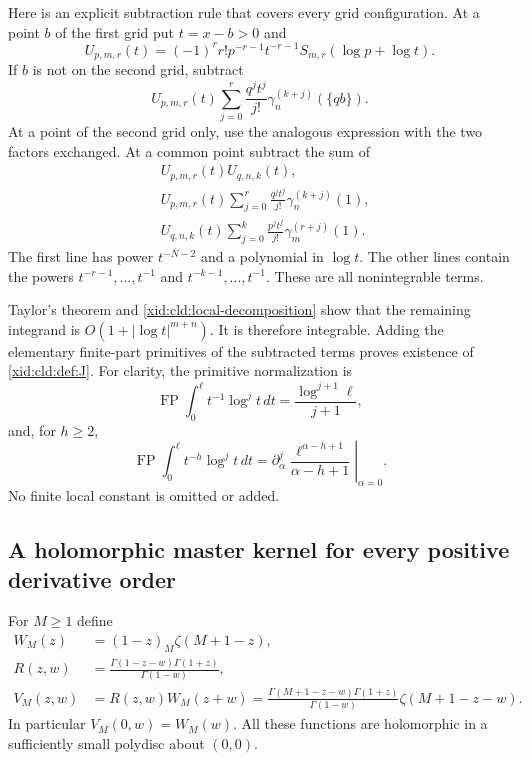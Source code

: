 \documentclass[11pt,a4paper]{article}
\numberwithin{equation}{section}
\theoremstyle{definition}
\theoremstyle{remark}
\begin{document}
Here is an explicit subtraction rule that covers every grid configuration.
At a point $b$ of the first grid put $t=x-b>0$ and
\[
 U_{p,m,r}(t)=(-1)^r r!p^{-r-1}t^{-r-1}
                     S_{m,r}(\log p+\log t).
\]
If $b$ is not on the second grid, subtract
\[
 U_{p,m,r}(t)\sum_{j=0}^r
       \frac{q^jt^j}{j!}\gamma_n^{(k+j)}(\{qb\}).
\]
At a point of the second grid only, use the analogous expression with
the two factors exchanged.  At a common point subtract the sum of
\begin{align}
 &U_{p,m,r}(t)U_{q,n,k}(t),\\
 &U_{p,m,r}(t)\sum_{j=0}^r
       \frac{q^jt^j}{j!}\gamma_n^{(k+j)}(1),\\
 &U_{q,n,k}(t)\sum_{j=0}^k
       \frac{p^jt^j}{j!}\gamma_m^{(r+j)}(1).
 \label{xid:cld:common-subtraction}
\end{align}
The first line has power $t^{-N-2}$ and a polynomial in $\log t$.
The other lines contain the powers $t^{-r-1},\ldots,t^{-1}$ and
$t^{-k-1},\ldots,t^{-1}$.  These are all nonintegrable terms.

Taylor's theorem and \eqref{xid:cld:local-decomposition} show that the
remaining integrand is $O(1+|\log t|^{m+n})$.  It is therefore integrable.
Adding the elementary finite-part primitives of the subtracted terms
proves existence of \eqref{xid:cld:def:J}.  For clarity, the primitive
normalization is
\[
 \operatorname{FP}\int_0^\ell t^{-1}\log^j t\,dt
      =\frac{\log^{j+1}\ell}{j+1},
\]
and, for $h\ge2$,
\[
 \operatorname{FP}\int_0^\ell t^{-h}\log^j t\,dt
 =\left.\partial_\alpha^j
       \frac{\ell^{\alpha-h+1}}{\alpha-h+1}\right|_{\alpha=0}.
\]
No finite local constant is omitted or added.

\subsection{A holomorphic master kernel for every positive derivative order}

For $M\ge1$ define
\begin{align}
 W_M(z)&=(1-z)_M\zeta(M+1-z),\\
 R(z,w)&=\frac{\Gamma(1-z-w)\Gamma(1+z)}{\Gamma(1-w)},\\
 V_M(z,w)&=R(z,w)W_M(z+w)
 =\frac{\Gamma(M+1-z-w)\Gamma(1+z)}{\Gamma(1-w)}
                  \zeta(M+1-z-w).
 \label{xid:cld:VW}
\end{align}
In particular $V_M(0,w)=W_M(w)$.  All these functions are holomorphic
in a sufficiently small polydisc about $(0,0)$.
\end{document}
